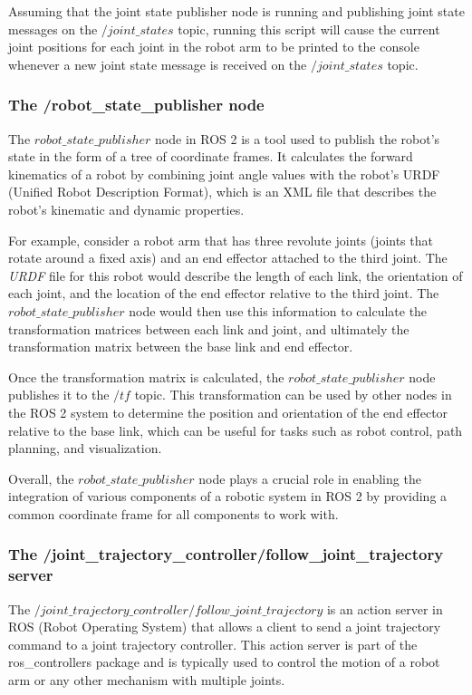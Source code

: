 \documentclass[12pt,oneside]{article}
\begin{document}
Assuming that the joint state publisher node is running and publishing joint state messages on the $/joint\_states$ topic, running this script will cause the current joint positions for each joint in the robot arm to be printed to the console whenever a new joint state message is received on the $/joint\_states$ topic.

\subsubsection{The /robot\_state\_publisher node}\label{ros2-robot-state-publisher}
The $robot\_state\_publisher$ node in ROS 2 is a tool used to publish the robot's state in the form of a tree of coordinate frames. It calculates the forward kinematics of a robot by combining joint angle values with the robot's URDF (Unified Robot Description Format), which is an XML file that describes the robot's kinematic and dynamic properties. 

For example, consider a robot arm that has three revolute joints (joints that rotate around a fixed axis) and an end effector attached to the third joint. The \textit{URDF} file for this robot would describe the length of each link, the orientation of each joint, and the location of the end effector relative to the third joint. The $robot\_state\_publisher$ node would then use this information to calculate the transformation matrices between each link and joint, and ultimately the transformation matrix between the base link and end effector.

Once the transformation matrix is calculated, the $robot\_state\_publisher$ node publishes it to the $/tf$ topic. This transformation can be used by other nodes in the ROS 2 system to determine the position and orientation of the end effector relative to the base link, which can be useful for tasks such as robot control, path planning, and visualization.

Overall, the $robot\_state\_publisher$ node plays a crucial role in enabling the integration of various components of a robotic system in ROS 2 by providing a common coordinate frame for all components to work with.

\subsubsection{The /joint\_trajectory\_controller/follow\_joint\_trajectory server}\label{ros2-joint-trajectory-controller}
The $/joint\_trajectory\_controller/follow\_joint\_trajectory$ is an action server in ROS (Robot Operating System) that allows a client to send a joint trajectory command to a joint trajectory controller. This action server is part of the ros\_controllers package and is typically used to control the motion of a robot arm or any other mechanism with multiple joints.
\end{document}
